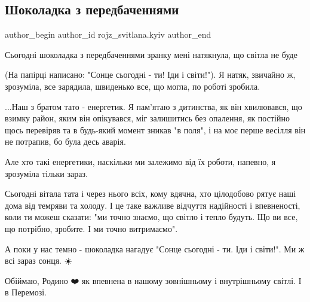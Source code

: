  
 
 
 
 
 
\subsection{Шоколадка з передбаченнями}
\label{sec:22_12_2022.fb.rojz_svitlana.kyiv.1.shokoladka}
 
\ifcmt
 author_begin
   author_id rojz_svitlana.kyiv
 author_end
\fi

Сьогодні шоколадка з передбаченнями зранку мені натякнула, що світла не буде 🙂

(На папірці написано: "Сонце сьогодні - ти! Іди і світи!"). Я натяк, звичайно
ж, зрозуміла, все зарядила, швиденько все, що могла, по роботі зробила. 

...Наш з братом тато - енергетик. Я пам'ятаю з дитинства, як він хвилювався, що
взимку район, яким він опікувався, міг залишитись без опалення, як постійно
щось перевіряв та в будь-який момент зникав "в поля", і на моє перше весілля
він не потрапив, бо була десь аварія. 

Але хто такі енергетики, наскільки ми залежимо від їх роботи, напевно, я
зрозуміла тільки зараз. 

Сьогодні вітала тата і через нього всіх, кому вдячна, хто цілодобово рятує наші
дома від темряви та холоду. І це таке важливе відчуття надійності і
впевненості, коли ти можеш сказати: "ми точно знаємо, що світло і тепло будуть.
Що ви все, що потрібно, зробите. І ми точно витримаємо". 

А поки у нас темно - шоколадка нагадує "Сонце сьогодні - ти. Іди і світи!". Ми
ж всі зараз сонця. ☀️

Обіймаю, Родино ❤️ як впевнена в нашому зовнішньому і внутрішньому світлі. І в
Перемозі.


